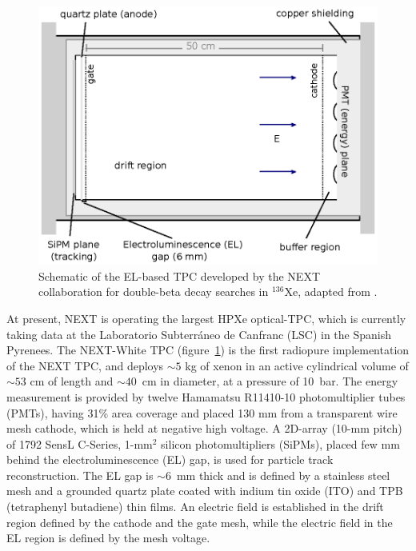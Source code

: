 \documentclass[%
 reprint,
superscriptaddress,
 amsmath,amssymb,
 aps,
]{revtex4-2}
\begin{document}
\begin{figure}[t]
\includegraphics{Fig2.eps}
\caption{\label{fig:NEW_TPC}Schematic of the EL-based TPC developed by the NEXT collaboration for double-beta decay searches in $^{136}$Xe, adapted from \cite{46}.}
\end{figure}


At present, NEXT is operating the largest HPXe optical-TPC, which is currently taking data at the Laboratorio Subterráneo de Canfranc (LSC) in the Spanish Pyrenees. The NEXT-White TPC (figure~\ref{fig:NEW_TPC}) is the first radiopure implementation of the NEXT TPC, and deploys $\sim 5$ kg of xenon in an active cylindrical volume of $\sim 53$ cm of length and $\sim 40$~cm in diameter, at a pressure of 10~bar. The energy measurement is provided by twelve Hamamatsu R11410-10 photomultiplier tubes (PMTs), having 31\% area coverage and placed 130 mm from a transparent wire mesh cathode, which is held at negative high voltage. A 2D-array (10-mm pitch) of 1792 SensL C-Series, 1-mm$^{2}$ silicon photomultipliers (SiPMs), placed few mm behind the electroluminescence (EL) gap, is used for particle track reconstruction. The EL gap is $\sim6$~mm thick and is defined by a stainless steel mesh and a grounded quartz plate coated with indium tin oxide (ITO) and TPB (tetraphenyl butadiene) thin films. An electric field is established in the drift region defined by the cathode and the gate mesh, while the electric field in the EL region is defined by the mesh voltage.
\end{document}
